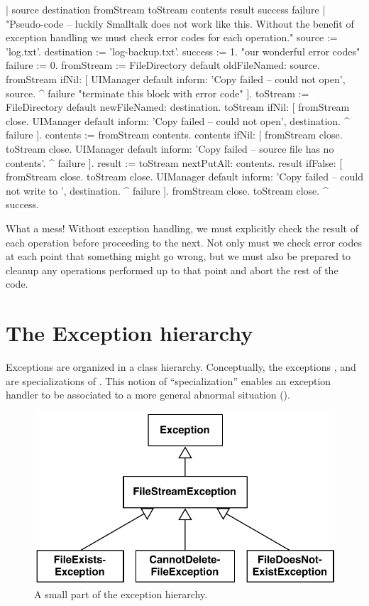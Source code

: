 \documentclass[a4paper,10pt,twoside]{book}
\begin{document}
\begin{code}{| source destination fromStream toStream contents result success failure |}
"Pseudo-code -- luckily Smalltalk does not work like this. Without the 
benefit of exception handling we must check error codes for each operation."
source := 'log.txt'.
destination := 'log-backup.txt'.
success := 1. "our wonderful error codes"
failure := 0.
fromStream := FileDirectory default oldFileNamed: source.
fromStream ifNil: [
	UIManager default inform: 'Copy failed -- could not open', source.
	^ failure "terminate this block with error code" ].
toStream := FileDirectory default newFileNamed: destination.
toStream ifNil: [
	fromStream close.
	UIManager default inform: 'Copy failed -- could not open', destination.
	^ failure ].
contents := fromStream contents.
contents ifNil: [
	fromStream close.
	toStream close.
	UIManager default inform: 'Copy failed -- source file has no contents'.
	^ failure ].
result := toStream nextPutAll: contents.
result ifFalse: [
	fromStream close.
	toStream close.
	UIManager default inform: 'Copy failed -- could not write to ', destination.
	^ failure ].
fromStream close.
toStream close.
^ success.
\end{code}
\noindent
What a mess!
Without exception handling, we must explicitly check the result of each operation before proceeding to the next.
Not only must we check error codes at each point that something might go wrong, but we must also be prepared to cleanup any operations performed up to that point and abort the rest of the code.

\section{The Exception hierarchy}

Exceptions are organized in a class hierarchy. Conceptually, the exceptions ,  and  are specializations of . This notion of ``specialization'' enables an exception handler to be associated to a more general abnormal situation ().

\begin{figure}[ht]\centering
        \includegraphics[width=.5\linewidth]{SimpleHierarchy}
        \caption{A small part of the \pharo exception hierarchy.}
\end{figure}
\end{document}

